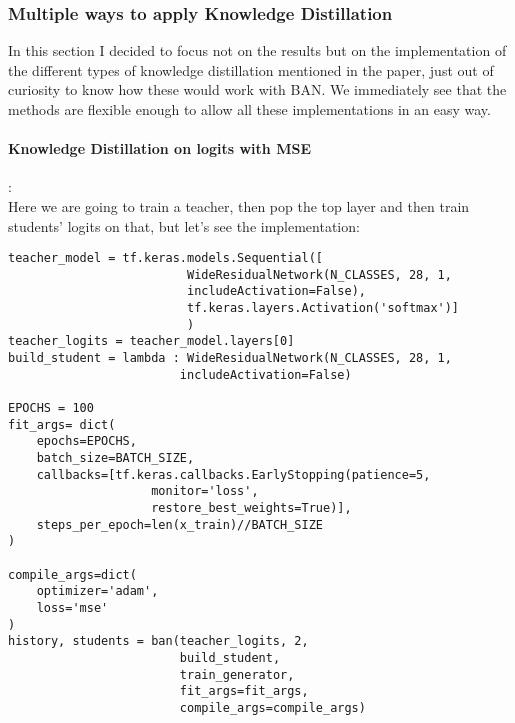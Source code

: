 \subsubsection{Multiple ways to apply Knowledge Distillation}
In this section I decided to focus not on the results but on the implementation of the different types of knowledge distillation mentioned in the paper\cite{kd}, just out of curiosity to know how these would work with BAN. We immediately see that the methods  are flexible enough to allow all these implementations in an easy way.
\paragraph{Knowledge Distillation on logits with MSE}:\\
Here we are going to train a teacher, then pop the top layer and then train students' logits on that, but let's see the implementation:
\lstset{language=Python}
\lstset{frame=lines}
\lstset{basicstyle=\footnotesize}
\begin{lstlisting}
teacher_model = tf.keras.models.Sequential([
                         WideResidualNetwork(N_CLASSES, 28, 1, 
                         includeActivation=False),
                         tf.keras.layers.Activation('softmax')]
                         )
teacher_logits = teacher_model.layers[0]
build_student = lambda : WideResidualNetwork(N_CLASSES, 28, 1, 
						includeActivation=False)
						
EPOCHS = 100
fit_args= dict(
    epochs=EPOCHS,
    batch_size=BATCH_SIZE,
    callbacks=[tf.keras.callbacks.EarlyStopping(patience=5, 
    				monitor='loss', 
    				restore_best_weights=True)],
    steps_per_epoch=len(x_train)//BATCH_SIZE
)

compile_args=dict(
    optimizer='adam',
    loss='mse'
)
history, students = ban(teacher_logits, 2, 
						build_student, 
						train_generator, 
						fit_args=fit_args, 
						compile_args=compile_args)
\end{lstlisting}

